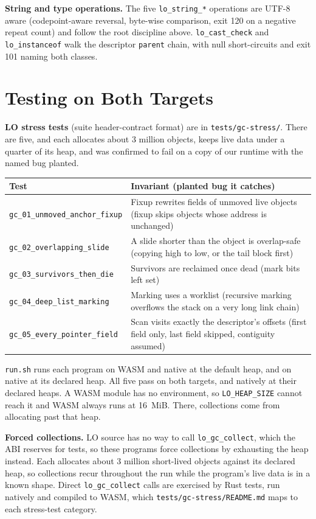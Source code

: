 \documentclass[10pt]{article}
\newcommand{\code}[1]{\texttt{\small #1}}
\begin{document}
\textbf{String and type operations.} The five \code{lo\_string\_*} operations are UTF-8 aware (codepoint-aware reversal, byte-wise comparison, exit 120 on a negative repeat count) and follow the root discipline above. \code{lo\_cast\_check} and \code{lo\_instanceof} walk the descriptor \code{parent} chain, with null short-circuits and exit 101 naming both classes.

\section{Testing on Both Targets}
\textbf{LO stress tests} (suite header-contract format) are in \code{tests/gc-stress/}. There are five, and each allocates about 3 million objects, keeps live data under a quarter of its heap, and was confirmed to fail on a copy of our runtime with the named bug planted.
\begin{center}\small
\begin{tabularx}{\linewidth}{@{}l X@{}}
\toprule
\textbf{Test} & \textbf{Invariant (planted bug it catches)} \\
\midrule
\code{gc\_01\_unmoved\_anchor\_fixup} & Fixup rewrites fields of unmoved live objects (fixup skips objects whose address is unchanged) \\
\code{gc\_02\_overlapping\_slide} & A slide shorter than the object is overlap-safe (copying high to low, or the tail block first) \\
\code{gc\_03\_survivors\_then\_die} & Survivors are reclaimed once dead (mark bits left set) \\
\code{gc\_04\_deep\_list\_marking} & Marking uses a worklist (recursive marking overflows the stack on a very long link chain) \\
\code{gc\_05\_every\_pointer\_field} & Scan visits exactly the descriptor's offsets (first field only, last field skipped, contiguity assumed) \\
\bottomrule
\end{tabularx}
\end{center}
\code{run.sh} runs each program on WASM and native at the default heap, and on native at its declared heap. All five pass on both targets, and natively at their declared heaps. A WASM module has no environment, so \code{LO\_HEAP\_SIZE} cannot reach it and WASM always runs at 16~MiB. There, collections come from allocating past that heap.

\textbf{Forced collections.} LO source has no way to call \code{lo\_gc\_collect}, which the ABI reserves for tests, so these programs force collections by exhausting the heap instead. Each allocates about 3 million short-lived objects against its declared heap, so collections recur throughout the run while the program's live data is in a known shape. Direct \code{lo\_gc\_collect} calls are exercised by Rust tests, run natively and compiled to WASM, which \code{tests/gc-stress/README.md} maps to each stress-test category.
\end{document}
